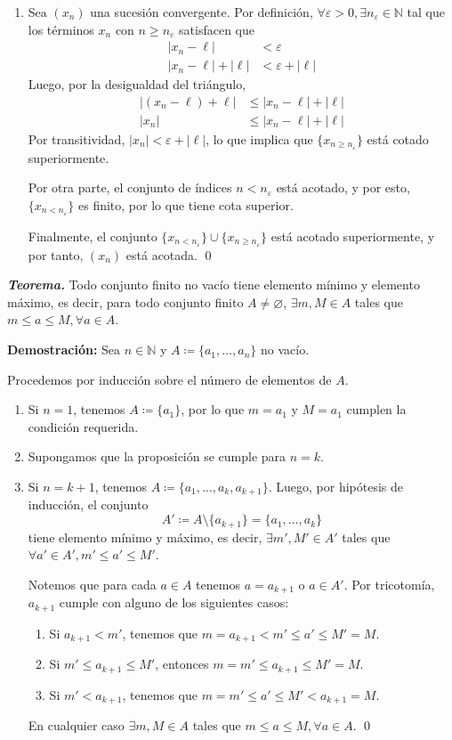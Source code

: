 \documentclass[11pt]{article}
\newcommand{\N}{\mathbb{N}}
\let\epsilon\varepsilon
\let\emptyset\varnothing
\begin{document}
\begin{enumerate}[label=\alph*)]
%
 \item Sea $(x_n)$ una sucesión convergente. Por definición, $\forall \epsilon>0, \exists n_\varepsilon \in \N$ tal que los términos $x_n$ con $n\geq n_\varepsilon$ satisfacen que \begin{align*}
  |x_n - \ell| &< \epsilon \\
  |x_n - \ell| + |\ell| &< \epsilon + |\ell|
 \end{align*}
 Luego, por la desigualdad del triángulo, \begin{align*}
  \big|(x_n-\ell)+\ell\big| &\leq |x_n-\ell| + |\ell|\\
  |x_n| &\leq |x_n-\ell| + |\ell|
 \end{align*}
 Por transitividad, $|x_n|< \epsilon + |\ell|$, lo que implica que $\{x_{n\geq n_\varepsilon}\}$ está cotado superiormente.
 
 Por otra parte, el conjunto de índices $n<n_\varepsilon$ está acotado, y por esto, $\{x_{n<n_\varepsilon}\}$ es finito, por lo que tiene cota superior. %
 
 Finalmente, el conjunto $\{x_{n<n_\varepsilon}\} \cup \{x_{n\geq n_\varepsilon}\}$ está acotado superiormente, y por tanto, $(x_n)$ está acotada. \qed
\end{enumerate}

\textbf{\textit{Teorema.}} Todo conjunto finito no vacío tiene elemento mínimo y elemento máximo, es decir, para todo conjunto finito $A\neq \emptyset$, $\exists m,M\in A$ tales que $m\leq a\leq M, \forall a\in A$.

\textbf{Demostración:} Sea $n\in \N$ y $A \coloneqq \{a_1, \dots, a_n\}$ no vacío.

Procedemos por inducción sobre el número de elementos de $A$. \begin{enumerate}[label=\roman*)]
 \item Si $n=1$, tenemos $A\coloneqq\{a_1\}$, por lo que $m=a_1$ y $M=a_1$ cumplen la condición requerida.
 \item Supongamos que la proposición se cumple para $n=k$.
 \item Si $n=k+1$, tenemos $A\coloneqq \{a_1, \dots, a_k, a_{k+1}\}$. Luego, por hipótesis de inducción, el conjunto \[A' \coloneqq A \setminus \{a_{k+1}\} = \{a_1, \dots, a_k\}\] tiene elemento mínimo y máximo, es decir, $\exists m',M'\in A'$ tales que $\forall a'\in A', m'\leq a' \leq M'$.
 
 Notemos que para cada $a\in A$ tenemos $a=a_{k+1}$ o $a\in A'$. Por tricotomía, $a_{k+1}$ cumple con alguno de los siguientes casos:
 \begin{enumerate}[label=\alph*)]
  \item Si $a_{k+1}<m'$, tenemos que $m=a_{k+1}<m'\leq a' \leq M'=M$.
  \item Si $m' \leq a_{k+1}\leq M'$, entonces $m=m'\leq a_{k+1} \leq M'=M$.
  \item Si $m'<a_{k+1}$, tenemos que $m=m'\leq a' \leq M'<a_{k+1}=M$.
 \end{enumerate}
 En cualquier caso $\exists m,M\in A$ tales que $m\leq a\leq M, \forall a\in A$. \qed
\end{enumerate}
\end{document}
